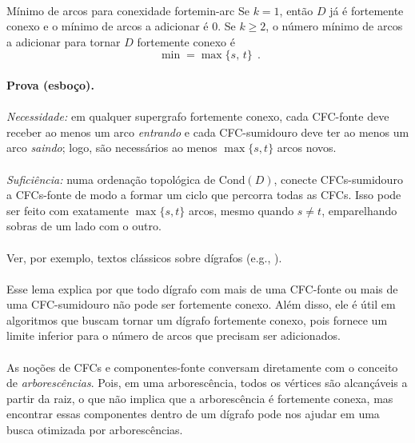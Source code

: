 \documentclass[12pt,a4paper]{article}
\begin{document}
\paragraph{}
\begin{lemabox}{Mínimo de arcos para conexidade forte}{min-arc}
Se $k=1$, então $D$ já é fortemente conexo e o mínimo de arcos a adicionar é $0$. Se $k\ge 2$, o número mínimo de arcos a adicionar para tornar $D$ fortemente conexo é \[\boxed{\;\min = \max\{s,\,t\}\;}\,.\]

\paragraph{}
	\textbf{Prova (esboço).} 
    \paragraph{}
    \emph{Necessidade:} em qualquer supergrafo fortemente conexo, cada CFC-fonte deve receber ao menos um arco \emph{entrando} e cada CFC-sumidouro deve ter ao menos um arco \emph{saindo}; logo, são necessários ao menos $\max\{s,t\}$ arcos novos. 
    
    \paragraph{}
    \emph{Suficiência:} numa ordenação topológica de $\mathrm{Cond}(D)$, conecte CFCs-sumidouro a CFCs-fonte de modo a formar um ciclo que percorra todas as CFCs. Isso pode ser feito com exatamente $\max\{s,t\}$ arcos, mesmo quando $s\ne t$, emparelhando sobras de um lado com o outro. 
    
    \paragraph{}
    Ver, por exemplo, textos clássicos sobre dígrafos (e.g., \cite{schrijver2003comb}).
\end{lemabox}

\paragraph{}
Esse lema explica por que todo dígrafo com mais de uma CFC-fonte ou mais de uma CFC-sumidouro não pode ser fortemente conexo. Além disso, ele é útil em algoritmos que buscam tornar um dígrafo fortemente conexo, pois fornece um limite inferior para o número de arcos que precisam ser adicionados.

\paragraph{}
As noções de CFCs e componentes-fonte conversam diretamente com o conceito de \emph{arborescências}. Pois, em uma arborescência, todos os vértices são alcançáveis a partir da raiz, o que não implica que a arborescência é fortemente conexa, mas encontrar essas componentes dentro de um dígrafo pode nos ajudar em uma busca otimizada por arborescências.
\end{document}

